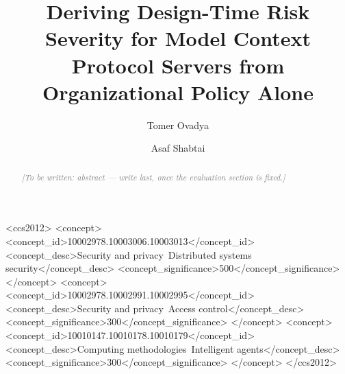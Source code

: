 \documentclass[sigconf]{acmart}
\newcommand{\stub}[1]{\textit{\textcolor{gray}{[To be written: #1]}}}
\begin{document}
\title{Deriving Design-Time Risk Severity for Model Context Protocol Servers
from Organizational Policy Alone}

\author{Tomer Ovadya}

\author{Asaf Shabtai}

\renewcommand{\shortauthors}{Ovadya and Shabtai}

\begin{abstract}
\stub{abstract --- write last, once the evaluation section is fixed.}
\end{abstract}

\begin{CCSXML}
<ccs2012>
   <concept>
       <concept_id>10002978.10003006.10003013</concept_id>
       <concept_desc>Security and privacy~Distributed systems security</concept_desc>
       <concept_significance>500</concept_significance>
       </concept>
   <concept>
       <concept_id>10002978.10002991.10002995</concept_id>
       <concept_desc>Security and privacy~Access control</concept_desc>
       <concept_significance>300</concept_significance>
       </concept>
   <concept>
       <concept_id>10010147.10010178.10010179</concept_id>
       <concept_desc>Computing methodologies~Intelligent agents</concept_desc>
       <concept_significance>300</concept_significance>
       </concept>
 </ccs2012>
\end{CCSXML}



\maketitle
\end{document}
